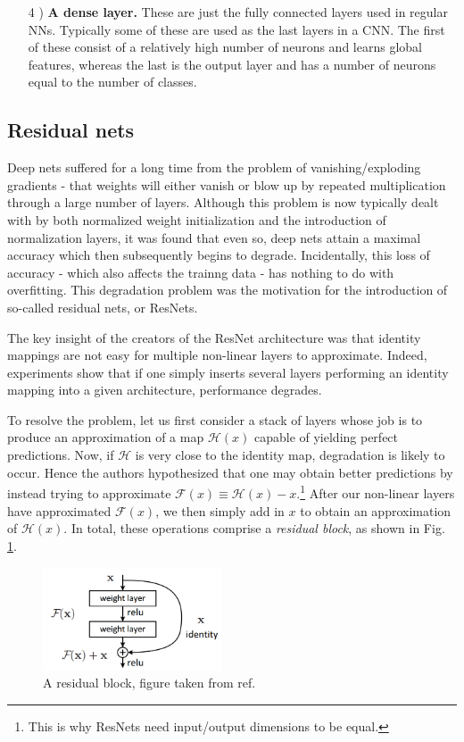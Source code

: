 \documentclass[]{article}
\begin{document}
\begin{itemize}
	\item[4]) \textbf{A dense layer.} These are just the fully connected layers used in regular NNs. Typically some of these are used as the last layers in a CNN. The first of these consist of a relatively high number of neurons and learns global features, whereas the last is the output layer and has a number of neurons equal to the number of classes.
\end{itemize}

\subsection{Residual nets}
Deep nets suffered for a long time from the problem of vanishing/exploding gradients - that weights will either vanish or blow up by repeated multiplication through a large number of layers. Although this problem is now typically dealt with by both normalized weight initialization and the introduction of normalization layers\cite{LeCun2012}, it was found that even so, deep nets attain a maximal accuracy which then subsequently begins to degrade.\cite{degrad} Incidentally, this loss of accuracy - which also affects the trainng data - has nothing to do with overfitting. This degradation problem was the motivation for the introduction of so-called residual nets, or ResNets.\cite{resnet}

The key insight of the creators of the ResNet architecture was that identity mappings are not easy for multiple non-linear layers to approximate. Indeed, experiments show that if one simply inserts several layers performing an identity mapping into a given architecture, performance degrades. 

To resolve the problem, let us first consider a stack of layers whose job is to produce an approximation of a map $\mathcal{H}(x)$ capable of yielding perfect predictions. Now, if $\mathcal{H}$ is very close to the identity map, degradation is likely to occur. Hence the authors hypothesized that one may obtain better predictions by instead trying to approximate $\mathcal{F}(x) \equiv \mathcal{H}(x) - x$.\footnote{This is why ResNets need input/output dimensions to be equal.} After our non-linear layers have approximated $\mathcal{F}(x)$, we then simply add in $x$ to obtain an approximation of $\mathcal{H}(x)$. In total, these operations comprise a \textit{residual block}, as shown in Fig. \ref{fig:residual_block}.

\begin{figure}
	\centering
	\includegraphics[width=200px]{residual_block.png}
	\caption{A residual block, figure taken from ref. \cite{resnet}}
	\label{fig:residual_block}
\end{figure}
\end{document}
